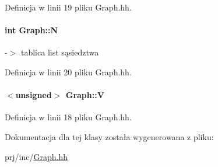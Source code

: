 Definicja w linii 19 pliku Graph.\-hh.

\hypertarget{class_graph_ae9cf5ba4841d02a2746033b68bd38764}{
\paragraph[{N}]{\setlength{\rightskip}{0pt plus 5cm}int Graph\-::\-N\hspace{0.3cm}{\ttfamily [protected]}}}\label{class_graph_ae9cf5ba4841d02a2746033b68bd38764}
-\/$>$ tablica list sąsiedztwa 

Definicja w linii 20 pliku Graph.\-hh.

\hypertarget{class_graph_ab2e9947e838cf65a60dfa3ec57367c45}{
\paragraph[{V}]{$<$unsigned$>$ Graph\-::\-V\hspace{0.3cm}{\ttfamily [protected]}}}\label{class_graph_ab2e9947e838cf65a60dfa3ec57367c45}


Definicja w linii 18 pliku Graph.\-hh.



Dokumentacja dla tej klasy została wygenerowana z pliku\-:\begin{DoxyCompactItemize}
\item 
prj/inc/\hyperlink{_graph_8hh}{Graph.\-hh}\end{DoxyCompactItemize}
